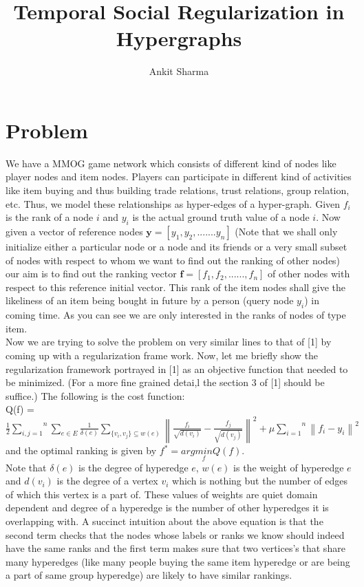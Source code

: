 \documentclass[12pt]{article}
\title{Temporal Social Regularization in Hypergraphs}
\author{Ankit Sharma}
\begin{document}
 
\maketitle


\section{Problem}

We have a MMOG game network which consists of different kind of nodes like player nodes and item nodes. Players can participate in different kind
of activities like item buying and thus building trade relations, trust relations, group relation, etc. Thus, we model these relationships as hyper-edges of a hyper-graph. Given \(f_i\) is the rank of a node \(i\) and \(y_i\) is the actual ground truth value of a node \(i\). Now given a vector of reference nodes \(\mathbf{y} = [y_1,y_2,.......y_n]\)  (Note that we shall only initialize either a particular node or a node and its friends or a very small subset of nodes with respect to whom we want to find out the ranking of other nodes) our aim is to find out the ranking vector \(\mathbf{f} = [f_1,f_2,......,f_n]\) of other nodes with respect to this reference initial vector. This rank of the item nodes shall give the likeliness of an item being bought in future by a person (query node \(y_i\)) in coming time. As you can see we are only interested in the ranks of nodes of type item.\\

Now we are trying to solve the problem on very similar lines to that of [1] by coming up with a regularization frame work. Now, let me briefly show the regularization framework portrayed in [1] as an objective function that needed to be minimized. (For a more fine grained detai,l the section 3 of [1] should be suffice.) The following is the cost function: \\ 

 Q(f) = \( \frac{1}{2} \overset{n}{\underset{i,j=1}{\sum}} \underset{e \in E}{\sum} \frac{1}{\delta(e)} \underset{ \{v_i, v_j \}{ \subseteq w(e)}}{\sum}  \left \|  \frac{f_i}{\sqrt{d(v_i)}} - \frac{f_j}{\sqrt{d(v_j)}}  \right \|^{2} + \mu \overset{n}{\underset{i=1}{\sum}} \left\|f_i - y_i\right\|^{2} \) \\

and the optimal ranking is given by  \(f^{*} = arg \underset{f}{min}  Q(f)\).\\ Note that \(\delta(e)\) is the degree of hyperedge \(e\), \(w(e)\) is the weight of hyperedge \(e\) and \(d(v_i)\) is the degree of a vertex \(v_i\) which is nothing but the number of edges of which this vertex is a part of. These values of weights are quiet domain dependent and degree of a hyperedge is the number of other hyperedges it is overlapping with. A succinct intuition about the above equation is that the second term checks that the nodes whose labels or ranks we know should indeed have the same ranks and the first term makes sure that two vertices's  that share many hyperedges (like many people buying the same item hyperedge or are being a part of same group hyperedge) are likely to have similar rankings. \\
\end{document}
